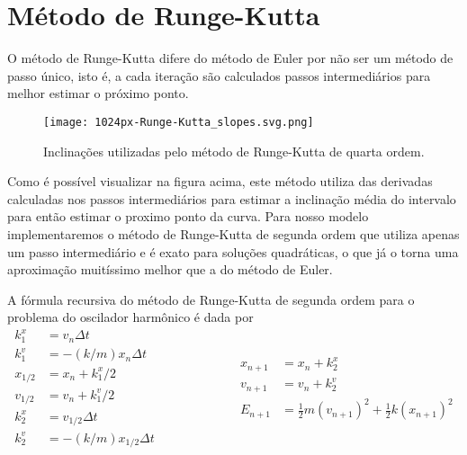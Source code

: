 \documentclass[12pt]{article}
\begin{document}
    \section*{Método de Runge-Kutta}
    O método de Runge-Kutta difere do método de Euler por não ser um método de passo único, isto é, a cada iteração são 
    calculados passos intermediários para melhor estimar o próximo ponto.
    \begin{figure}[h]
        \centering
        \texttt{[image: 1024px-Runge-Kutta\_slopes.svg.png]}
        \caption{Inclinações utilizadas pelo método de Runge-Kutta de quarta ordem.}
    \end{figure}
    \par Como é possível visualizar na figura acima, este método utiliza das derivadas calculadas nos passos intermediários
    para estimar a inclinação média do intervalo para então estimar o proximo ponto da curva. Para nosso modelo 
    implementaremos o método de Runge-Kutta de segunda ordem que utiliza apenas um passo intermediário e é exato para 
    soluções quadráticas, o que já o torna uma aproximação muitíssimo melhor que a do método de Euler.
    \par A fórmula recursiva do método de Runge-Kutta de segunda ordem para o problema do oscilador harmônico é dada por
    \begin{equation*}
        \begin{split}
            k_1^x&=v_n\Delta t\\
            k_1^v&=-(k/m)x_n\Delta t\\
            x_{1/2}&=x_n+k_1^x/2\\
            v_{1/2}&=v_n+k_1^v/2\\
            k_2^x&=v_{1/2}\Delta t\\
            k_2^v&=-(k/m)x_{1/2}\Delta t
        \end{split}
        \quad\quad\quad\quad\quad\quad
        \boxed{
        \begin{split}
            x_{n+1}&=x_n+k_2^x\\
            v_{n+1}&=v_n+k_2^v\\
            E_{n+1}&=\frac{1}{2}m\left(v_{n+1}\right)^2+\frac{1}{2}k\left(x_{n+1}\right)^2
        \end{split}
        }
    \end{equation*}
    \newpage
\end{document}
